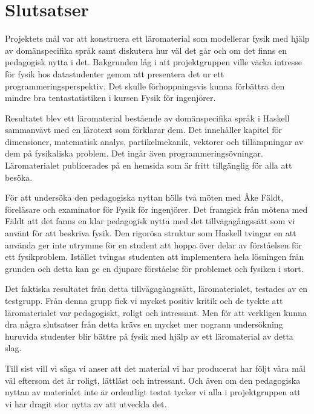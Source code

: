 
\chapter{Slutsatser}

Projektets mål var att konstruera ett läromaterial som modellerar fysik med
hjälp av domänspecifika språk samt diskutera hur väl det går och om det finns en
pedagogisk nytta i det. Bakgrunden låg i att projektgruppen ville väcka intresse
för fysik hos datastudenter genom att presentera det ur ett 
programmeringsperspektiv. Det skulle förhoppningsvis kunna förbättra den mindre
bra tentastatistiken i kursen Fysik för ingenjörer.

Resultatet blev ett läromaterial bestående av domänspecifika språk i Haskell
sammanvävt med en lärotext som förklarar dem. Det innehåller kapitel för
dimensioner, matematisk analys, partikelmekanik, vektorer och tillämpningar av
dem på fysikaliska problem. Det ingår även programmeringsövningar.
Läromaterialet publicerades på en hemsida som är fritt tillgänglig för alla att
besöka.

För att undersöka den pedagogiska nyttan hölls två möten med Åke Fäldt, föreläsare och examinator för Fysik
för ingenjörer. Det framgick från mötena med Fäldt att det fanns en klar
pedagogisk nytta med det tillvägagångssätt som vi använt för att beskriva fysik.
Den rigorösa struktur som Haskell tvingar en att använda ger inte utrymme för en
student att hoppa över delar av förståelsen för ett fysikproblem. Istället
tvingas studenten att implementera hela lösningen från grunden och detta kan
ge en djupare förståelse för problemet och fysiken i stort. 

Det faktiska resultatet från detta tillvägagångssätt, läromaterialet,
testades av en testgrupp. Från denna grupp fick vi mycket positiv kritik och de
tyckte att läromaterialet var pedagogiskt, roligt och intressant. Men för att
verkligen kunna dra några slutsatser från detta krävs en mycket mer nogrann
undersökning huruvida studenter blir bättre på fysik med hjälp av ett
läromaterial av detta slag.

Till sist vill vi säga vi anser att det material vi har producerat har följt våra mål väl eftersom det är roligt, lättläst och intressant. Och även om den pedagogiska nyttan av materialet inte är ordentligt testat tycker vi alla i projektgruppen att vi har dragit stor nytta av att utveckla det.
